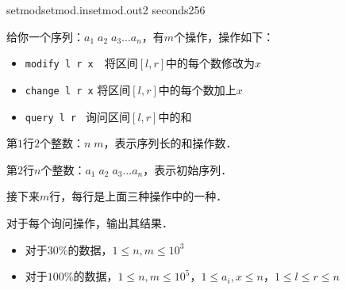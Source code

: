 \documentclass[11pt,a4paper,oneside]{article}
\begin{document}
\begin{problem}{setmod}{setmod.in}{setmod.out}{2 seconds}{256}
		
	给你一个序列：$a_1 \; a_2 \; a_3 \dots  a_n $，有$m$个操作，操作如下：
	
	\begin{itemize}
		\item \texttt{modify l r x}　将区间$[l,r]$中的每个数修改为$x$
		\item \texttt{change l r x} 将区间$[l,r]$中的每个数加上$x$
		\item \texttt{query l r } 询问区间$[l,r]$中的和
	\end{itemize}
	
	\InputFile
	
	第$1$行$2$个整数：$n \; m$，表示序列长的和操作数．

	第$2$行$n$个整数：$a_1 \; a_2 \; a_3 \dots a_n$，表示初始序列．
	
	接下来$m$行，每行是上面三种操作中的一种．
	
	\OutputFile
	
	对于每个询问操作，输出其结果．
	
	\Example
	
	\begin{example}
	\end{example}
	
	\Note
	\begin{itemize}
		\item 对于$30\%$的数据，$1 \leq n, m \leq 10^3$
		\item 对于$100\%$的数据，$1 \leq n, m \leq 10^5$，$1 \leq a_i, x \leq n$，$1 \leq l \leq r \leq n$
	\end{itemize}
	
\end{problem}
\end{document}
